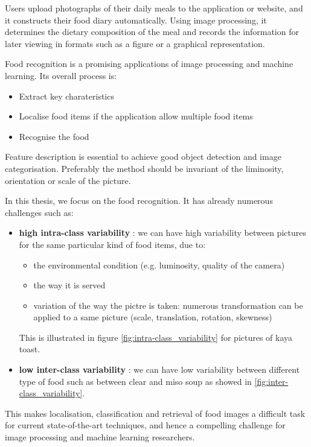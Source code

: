 Users upload photographs of their daily meals to the application or website, and it constructs their food diary automatically. Using image processing, it determines the dietary composition of the meal and records the information for later viewing in formats such as a figure or a graphical representation.

Food recognition is a promising applications of image processing and machine learning. Its overall process is:
\begin{itemize}
    \item Extract key charateristics
    \item Localise food items if the application allow multiple food items
    \item Recognise the food
\end{itemize}
Feature description is essential to achieve good object detection and image categorisation. Preferably the method should be invariant of the liminosity, orientation or scale of the picture.

In this thesis, we focus on the food recognition. It has already numerous challenges such as:
\begin{itemize}
    \item \textbf{high intra-class variability} : we can have high variability between pictures for the same particular kind of food items, due to:
    \begin{itemize}
        \item the environmental condition (e.g. luminosity, quality of the camera)
        \item the way it is served
        \item variation of the way the pictre is taken: numerous transformation can be applied to a same picture (scale, translation, rotation, skewness)
    \end{itemize}
    This is illustrated in figure \ref{fig:intra-class_variability} for pictures of kaya toast.
    
    \item \textbf{low inter-class variability} : we can have low variability between different type of food such as between clear and miso soup as showed in \ref{fig:inter-class_variability}.
\end{itemize}

This makes localisation, classification and retrieval of food images a difficult task for current state-of-the-art techniques, and hence a compelling challenge for image processing and machine learning researchers.

